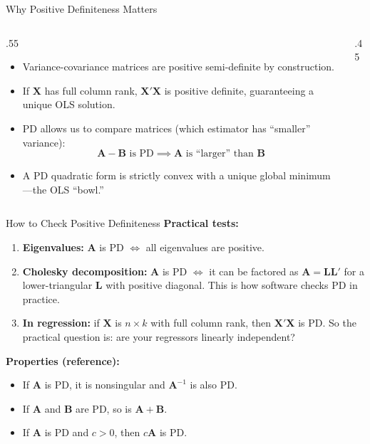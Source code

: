 \documentclass[aspectratio=169, handout, t]{beamer}
\numberwithin{equation}{section}
\begin{document}
\begin{frame}{Why Positive Definiteness Matters}
\begin{columns}
\begin{column}{.55\textwidth}
\begin{itemize}
\item Variance-covariance matrices are positive semi-definite by construction.
\item If $\bm{X}$ has full column rank, $\bm{X}'\bm{X}$ is positive definite, guaranteeing a unique OLS solution.
\item PD allows us to compare matrices (which estimator has ``smaller'' variance):
$$\bm{A}-\bm{B} \text{ is PD} \implies \bm{A} \text{ is ``larger'' than } \bm{B}$$
\item A PD quadratic form is strictly convex with a unique global minimum---the OLS ``bowl.''
\end{itemize}
\end{column}
\begin{column}{.45\textwidth}
\begin{center}
\end{center}
\end{column}
\end{columns}
\end{frame}


\begin{frame}{How to Check Positive Definiteness}
\textbf{Practical tests:}
\begin{enumerate}
\item \textbf{Eigenvalues:} $\bm{A}$ is PD $\iff$ all eigenvalues are positive.
\item \textbf{Cholesky decomposition:} $\bm{A}$ is PD $\iff$ it can be factored as $\bm{A}=\bm{L}\bm{L}'$ for a lower-triangular $\bm{L}$ with positive diagonal. This is how software checks PD in practice.
\item \textbf{In regression:} if $\bm{X}$ is $n\times k$ with full column rank, then $\bm{X}'\bm{X}$ is PD. So the practical question is: are your regressors linearly independent?
\end{enumerate}\pause
\textbf{Properties (reference):}
\begin{itemize}
\item If $\bm{A}$ is PD, it is nonsingular and $\bm{A}^{-1}$ is also PD.
\item If $\bm{A}$ and $\bm{B}$ are PD, so is $\bm{A}+\bm{B}$.
\item If $\bm{A}$ is PD and $c>0$, then $c\bm{A}$ is PD.
\end{itemize}
\end{frame}
\end{document}
